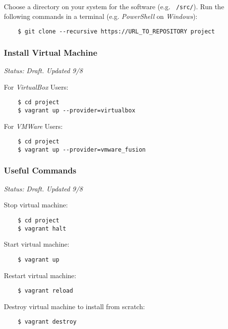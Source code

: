 Choose a directory on your system for the software (e.g. \texttt{~/src/}). Run the following commands in a terminal (e.g. \emph{PowerShell} on \emph{Windows}):

\begin{verbatim}
    $ git clone --recursive https://URL_TO_REPOSITORY project
\end{verbatim}

\subsubsection{Install Virtual Machine}

\emph{Status: Draft. Updated 9/8}

For \emph{VirtualBox} Users:

\begin{verbatim}
    $ cd project
    $ vagrant up --provider=virtualbox
\end{verbatim}

For \emph{VMWare} Users:

\begin{verbatim}
    $ cd project
    $ vagrant up --provider=vmware_fusion
\end{verbatim}

\subsubsection{Useful Commands}

\emph{Status: Draft. Updated 9/8}

Stop virtual machine:

\begin{verbatim}
    $ cd project
    $ vagrant halt
\end{verbatim}

Start virtual machine:

\begin{verbatim}
    $ vagrant up
\end{verbatim}

Restart virtual machine:

\begin{verbatim}
    $ vagrant reload
\end{verbatim}

Destroy virtual machine to install from scratch:

\begin{verbatim}
    $ vagrant destroy
\end{verbatim}

